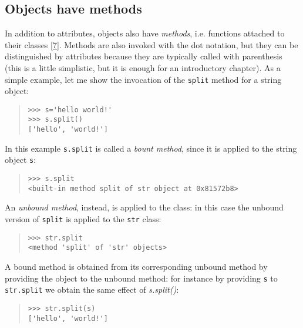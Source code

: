 \documentclass[10pt,english]{article}
\newcommand{\titlereference}[1]{\textsl{#1}}
\begin{document}

\hypertarget{objects-have-methods}{}
\subsection*{Objects have methods}

In addition to attributes, objects also have \emph{methods}, i.e. 
functions attached to their classes [\hyperlink{id13}{7}].
Methods are also invoked with the dot notation, but
they can be distinguished by attributes because they are typically
called with parenthesis (this is a little simplistic, but it is enough for
an introductory chapter). As a simple example, let me show the
invocation of the \texttt{split} method for a string object:
\begin{quote}
\begin{verbatim}>>> s='hello world!'
>>> s.split()
['hello', 'world!']\end{verbatim}
\end{quote}

In this example \texttt{s.split} is called a \emph{bount method}, since it is
applied to the string object \texttt{s}:
\begin{quote}
\begin{verbatim}>>> s.split
<built-in method split of str object at 0x81572b8>\end{verbatim}
\end{quote}

An \emph{unbound method}, instead, is applied to the class: in this case the
unbound version of \texttt{split} is applied to the \texttt{str} class:
\begin{quote}
\begin{verbatim}>>> str.split
<method 'split' of 'str' objects>\end{verbatim}
\end{quote}

A bound method is obtained from its corresponding unbound 
method by providing the object to the unbound method: for instance 
by providing \texttt{s} to \texttt{str.split} we obtain the same effect of \titlereference{s.split()}:
\begin{quote}
\begin{verbatim}>>> str.split(s)
['hello', 'world!']\end{verbatim}
\end{quote}
\end{document}
